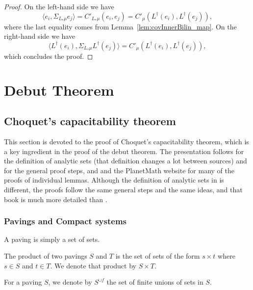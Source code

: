 \begin{proof}\leanok
  On the left-hand side we have
  $$\langle e_i, \Sigma_{L_*\mu} e_j\rangle = C'_{L_*\mu}(e_i, e_j) = C'_\mu(L^\dagger(e_i), L^\dagger(e_j)),$$
  where the last equality comes from Lemma~\ref{lem:covInnerBilin_map}. On the right-hand side we have
  $$\langle L^\dagger(e_i), \Sigma_{L_*\mu} L^\dagger(e_j)\rangle = C'_\mu(L^\dagger(e_i), L^\dagger(e_j)),$$
  which concludes the proof.
\end{proof}


\chapter{Debut Theorem}
\label{chap:debut_theorem}


\section{Choquet's capacitability theorem}

This section is devoted to the proof of Choquet's capacitability theorem, which is a key ingredient in the proof of the debut theorem. The presentation follows \cite{bichteler2002stochastic} for the definition of analytic sets (that definition changes a lot between sources) and for the general proof steps, and \cite{he2019semimartingale} and the PlanetMath website for many of the proofs of individual lemmas.
Although the definition of analytic sets in \cite{he2019semimartingale} is different, the proofs follow the same general steps and the same ideas, and that book is much more detailed than \cite{bichteler2002stochastic}.

\subsection{Pavings and Compact systems}

A paving is simply a set of sets.

\begin{definition}\label{def:image2_prod}
  \mathlibok
The product of two pavings $S$ and $T$ is the set of sets of the form $s \times t$ where $s \in S$ and $t \in T$. We denote that product by $S \times T$.
\end{definition}


\begin{definition}\label{def:supClosure}
  \mathlibok
For a paving $S$, we denote by $S^{\cup f}$ the set of finite unions of sets in $S$.
\end{definition}


